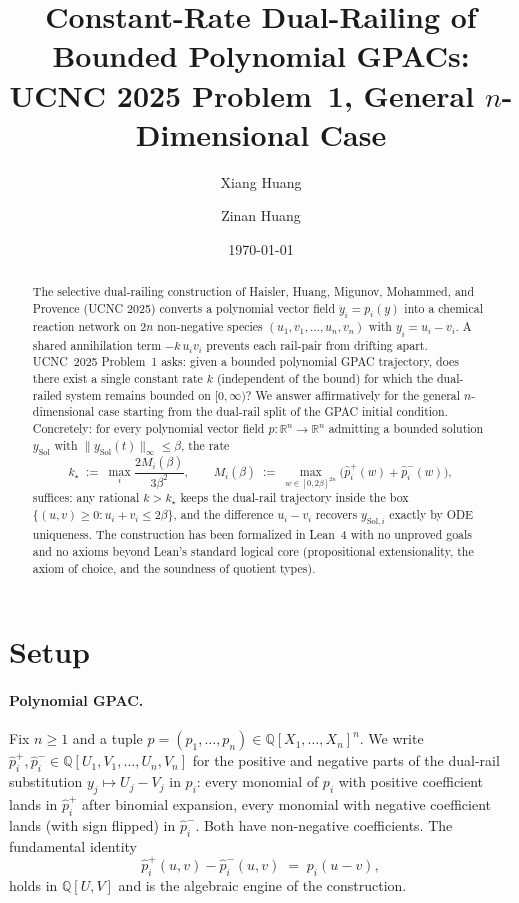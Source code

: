 \documentclass[11pt]{article}
\title{Constant-Rate Dual-Railing of Bounded Polynomial GPACs:\\
       UCNC 2025 Problem~1, General $n$-Dimensional Case}
\author{Xiang Huang \and Zinan Huang}
\date{\today}
\newcommand{\R}{\mathbb{R}}
\newcommand{\Q}{\mathbb{Q}}
\newcommand{\evalu}{\widehat{p}^{+}}
\newcommand{\evalv}{\widehat{p}^{-}}
\newcommand{\norm}[1]{\lVert #1 \rVert}
\begin{document}
\maketitle

\begin{abstract}
The selective dual-railing construction of Haisler, Huang, Migunov,
Mohammed, and Provence (UCNC 2025) converts a polynomial vector field
$\dot y_i = p_i(y)$ into a chemical reaction network on
$2n$ non-negative species $(u_1, v_1, \dots, u_n, v_n)$ with
$y_i = u_i - v_i$.  A shared annihilation term $-k\,u_i v_i$ prevents
each rail-pair from drifting apart.  UCNC~2025 Problem~1 asks: given a
bounded polynomial GPAC trajectory, does there exist a single constant
rate $k$ (independent of the bound) for which the dual-railed system
remains bounded on $[0, \infty)$?  We answer affirmatively for the
general $n$-dimensional case starting from the dual-rail split of the
GPAC initial condition.  Concretely: for every polynomial vector field
$p\colon \R^n \to \R^n$ admitting a bounded solution $y_{\mathrm{Sol}}$
with $\norm{y_{\mathrm{Sol}}(t)}_\infty \le \beta$, the rate
\[
  k_\star \;:=\; \max_i \frac{2 M_i(\beta)}{3\beta^2},
  \qquad
  M_i(\beta) \;:=\; \max_{w \in [0, 2\beta]^{2n}}
                    \bigl(\evalu_i(w) + \evalv_i(w)\bigr),
\]
suffices: any rational $k > k_\star$ keeps the dual-rail trajectory
inside the box $\{(u,v) \ge 0 : u_i + v_i \le 2\beta\}$, and the
difference $u_i - v_i$ recovers $y_{\mathrm{Sol}, i}$ exactly by ODE
uniqueness.  The construction has been formalized in Lean~4 with no
unproved goals and no axioms beyond Lean's standard logical core
(propositional extensionality, the axiom of choice, and the soundness
of quotient types).
\end{abstract}

\section{Setup}

\paragraph{Polynomial GPAC.}
Fix $n \ge 1$ and a tuple
$p = (p_1, \dots, p_n) \in \Q[X_1, \dots, X_n]^n$.  We write
$\widehat{p}_i^{+}, \widehat{p}_i^{-} \in \Q[U_1, V_1, \dots, U_n, V_n]$
for the positive and negative parts of the dual-rail substitution
$y_j \mapsto U_j - V_j$ in $p_i$: every monomial of $p_i$ with positive
coefficient lands in $\widehat{p}_i^{+}$ after binomial expansion, every
monomial with negative coefficient lands (with sign flipped) in
$\widehat{p}_i^{-}$.  Both have non-negative coefficients.  The
fundamental identity
\begin{equation}\label{eq:diff-id}
  \widehat{p}_i^{+}(u, v) - \widehat{p}_i^{-}(u, v)
    \;=\; p_i(u - v),
\end{equation}
holds in $\Q[U, V]$ and is the algebraic engine of the construction.
\end{document}
